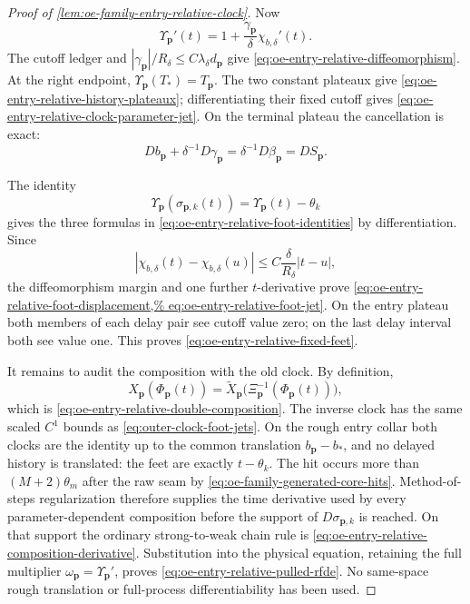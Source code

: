 \begin{proof}[Proof of
\cref{lem:oe-family-entry-relative-clock}]
Now
\[
 \Upsilon_{\mathbf p}'(t)
 =1+\frac{\gamma_{\mathbf p}}{\delta}
       \chi_{b,\delta}'(t).
\]
The cutoff ledger and
\(|\gamma_{\mathbf p}|/R_\delta\le
C\lambda_\delta d_{\mathbf p}\) give
\cref{eq:oe-entry-relative-diffeomorphism}.  At the right endpoint,
\(\Upsilon_{\mathbf p}(T_*)=T_{\mathbf p}\).  The two constant
plateaux give
\cref{eq:oe-entry-relative-history-plateaux}; differentiating their
fixed cutoff gives
\cref{eq:oe-entry-relative-clock-parameter-jet}.  On the terminal
plateau the cancellation is exact:
\[
 Db_{\mathbf p}+\delta^{-1}D\gamma_{\mathbf p}
 =\delta^{-1}D\beta_{\mathbf p}=DS_{\mathbf p}.
\]

The identity
\[
 \Upsilon_{\mathbf p}(\sigma_{\mathbf p,k}(t))
 =\Upsilon_{\mathbf p}(t)-\theta_k
\]
gives the three formulas in
\cref{eq:oe-entry-relative-foot-identities} by differentiation.  Since
\[
 |\chi_{b,\delta}(t)-\chi_{b,\delta}(u)|
 \le C\frac{\delta}{R_\delta}|t-u|,
\]
the diffeomorphism margin and one further \(t\)-derivative prove
\cref{eq:oe-entry-relative-foot-displacement,%
eq:oe-entry-relative-foot-jet}.  On the entry plateau both members of
each delay pair see cutoff value zero; on the last delay interval both
see value one.  This proves
\cref{eq:oe-entry-relative-fixed-feet}.

It remains to audit the composition with the old clock.  By definition,
\[
 X_{\mathbf p}(\Phi_{\mathbf p}(t))
 =\widetilde X_{\mathbf p}
   \bigl(\Xi_{\mathbf p}^{-1}(\Phi_{\mathbf p}(t))\bigr),
\]
which is \cref{eq:oe-entry-relative-double-composition}.  The inverse
clock has the same scaled \(C^1\) bounds as
\cref{eq:outer-clock-foot-jets}.  On the rough entry collar both clocks
are the identity up to the common translation \(b_{\mathbf p}-b_*\), and
no delayed history is translated: the feet are exactly
\(t-\theta_k\).  The hit occurs more than \((M+2)\theta_m\) after the
raw seam by \cref{eq:oe-family-generated-core-hits}.  Method-of-steps
regularization therefore supplies the time derivative used by every
parameter-dependent composition before the support of
\(D\sigma_{\mathbf p,k}\) is reached.  On that support the ordinary
strong-to-weak chain rule is
\cref{eq:oe-entry-relative-composition-derivative}.  Substitution into
the physical equation, retaining the full multiplier
\(\omega_{\mathbf p}=\Upsilon_{\mathbf p}'\), proves
\cref{eq:oe-entry-relative-pulled-rfde}.  No same-space rough
translation or full-process differentiability has been used.
\end{proof}

